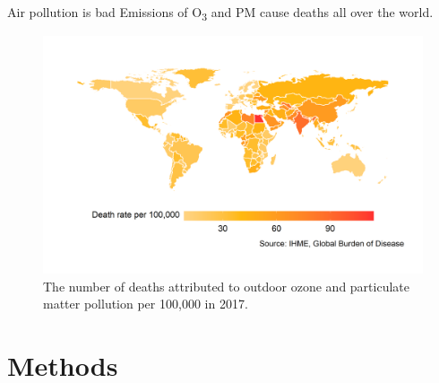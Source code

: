 \documentclass[xcolor=svgnames]{beamer}
\begin{document}
\begin{frame}
	
	\begin{alertblock}{Air pollution is bad}
		Emissions of O\textsubscript{3} and PM cause deaths all over the world.
	\end{alertblock}


	\begin{figure}[h]
		\centering
		\captionsetup{justification=centering}
		\includegraphics[width = .875\textwidth]{aq_deaths_map.png}
		\caption{The number of deaths attributed to outdoor ozone and particulate matter pollution per 100,000 in 2017.}
		\label{fig:aq_death_rate}
	\end{figure}

\end{frame}


\section{Methods}
\end{document}
